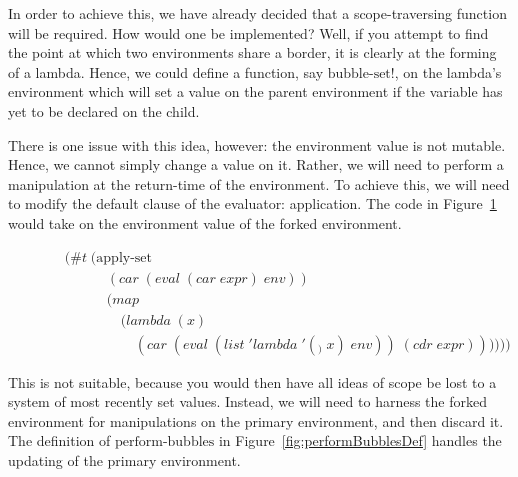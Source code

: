 In order to achieve this, we have already decided that a scope-traversing
function will be required. How would one be implemented? Well, if you attempt
to find the point at which two environments share a border, it is clearly at
the forming of a lambda. Hence, we could define a function, say 
$\text{bubble-set!}$, on the lambda's environment which will set a value on the
parent environment if the variable has yet to be declared on the child.

There is one issue with this idea, however: the environment value is not
mutable. Hence, we cannot simply change a value on it. Rather, we will need to
perform a manipulation at the return-time of the environment. To achieve this,
we will need to modify the default clause of the evaluator: application. The
code in Figure~\ref{fig:takeForkedEnvApply} would take on the environment value
of the forked environment.

\begin{figure}[htp]
\footnotesize
\caption{}\label{fig:takeForkedEnvApply}
\begin{align*}
& (\#t \; (\text{apply-set} \; 
\\& \qquad \quad (car \; (eval \; (car \; expr) \; env))
\\& \qquad \quad (map \; 
\\& \qquad \qquad (lambda \; (x) \; 
\\& \qquad \qquad \quad (car \; (eval \; (list \; 'lambda \; '(_) \; x) \; env)) \; (cdr \; expr))))))
\end{align*}
\end{figure}

This is not suitable, because you would then have all ideas of scope be lost to
a system of most recently set values. Instead, we will need to harness the
forked environment for manipulations on the primary environment, and then
discard it. The definition of $\text{perform-bubbles}$ in
Figure~\ref{fig:performBubblesDef} handles the updating of the primary
environment.

